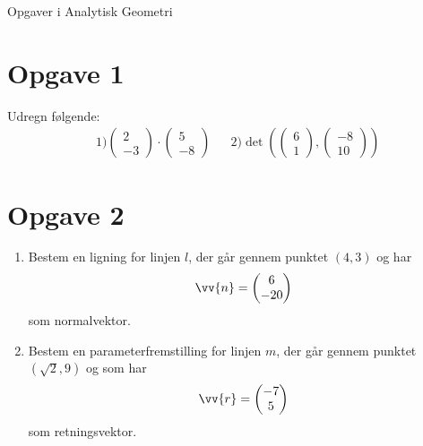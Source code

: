 \begin{center}
\Huge
Opgaver i Analytisk Geometri
\end{center}

\section*{Opgave 1}
Udregn følgende:
\begin{align*}
	&1) 
	\begin{pmatrix}
		2 \\ -3		
	\end{pmatrix} \cdot 
	\begin{pmatrix}
		5 \\- 8
	\end{pmatrix}	
	&&2)  
	\det \left(\begin{pmatrix}
		6 \\ 1		
	\end{pmatrix},
	\begin{pmatrix}
		-8 \\ 10
	\end{pmatrix}
	 \right)
\end{align*}
\section*{Opgave 2}
\begin{enumerate}[label=\roman*)]
	\item Bestem en ligning for linjen $l$, der går gennem punktet $(4,3)$ og har 
	\begin{align*}
		\vv{n} = 
		\begin{pmatrix}
			6 \\ -20
		\end{pmatrix}
	\end{align*}
	som normalvektor.
	\item 
	Bestem en parameterfremstilling for linjen $m$, der går gennem punktet $(\sqrt{2},9)$ og som har
	\begin{align*}
		\vv{r} = 
		\begin{pmatrix}
			-7 \\ 5
		\end{pmatrix}
	\end{align*}
	som retningsvektor.
\end{enumerate}
